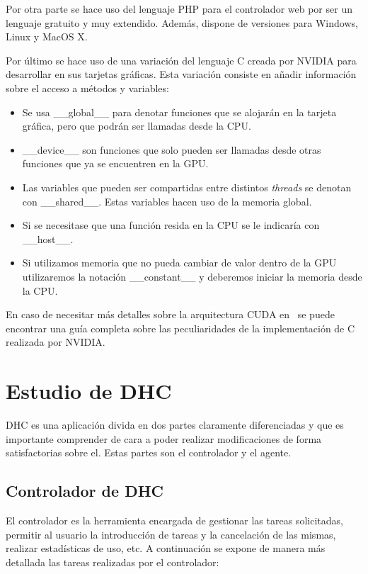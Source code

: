 Por otra parte se hace uso del lenguaje PHP para el controlador web por ser un lenguaje gratuito y muy extendido. Además, dispone de versiones para Windows, Linux y MacOS X.

Por último se hace uso de una variación del lenguaje C creada por NVIDIA para desarrollar en sus tarjetas gráficas. Esta variación consiste en añadir información sobre el acceso a métodos y variables:

\begin{itemize}
	\item Se usa \_\_global\_\_ para denotar funciones que se alojarán en la tarjeta gráfica, pero que podrán ser llamadas desde la CPU.

	\item \_\_device\_\_ son funciones que solo pueden ser llamadas desde otras funciones que ya se encuentren en la GPU.
	
	\item Las variables que pueden ser compartidas entre distintos \emph{threads} se denotan con \_\_shared\_\_. Estas variables hacen uso de la memoria global.
	
	\item Si se necesitase que una función resida en la CPU se le indicaría con \_\_host\_\_.
	
	\item Si utilizamos memoria que no pueda cambiar de valor dentro de la GPU utilizaremos la notación \_\_constant\_\_ y deberemos iniciar la memoria desde la CPU.
\end{itemize}

En caso de necesitar más detalles sobre la arquitectura CUDA en~\cite{nvidia:cuda_c_programming_guide} se puede encontrar una guía completa sobre las peculiaridades de la implementación de C realizada por NVIDIA.

\section{Estudio de DHC}

DHC es una aplicación divida en dos partes claramente diferenciadas y que es importante comprender de cara a poder realizar modificaciones de forma satisfactorias sobre el. Estas partes son el controlador y el agente.

\subsection{Controlador de DHC}
El controlador es la herramienta encargada de gestionar las tareas solicitadas, permitir al usuario la introducción de tareas y la cancelación de las mismas, realizar estadísticas de uso, etc. A continuación se expone de manera más detallada las tareas realizadas por el controlador:

